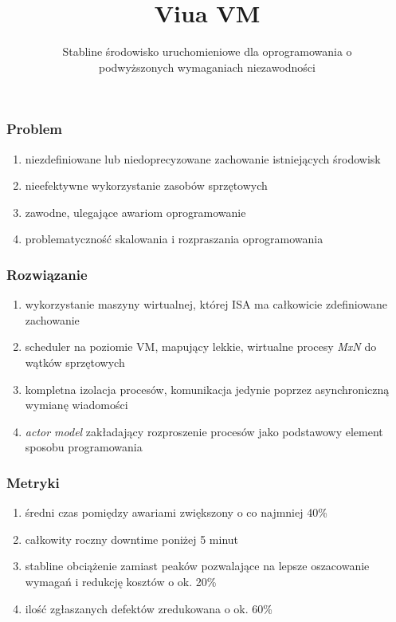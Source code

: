 \documentclass{beamer}
\title{Viua VM}
\subtitle{Stabline środowisko uruchomieniowe dla oprogramowania o\\podwyższonych wymaganiach niezawodności}
\begin{document}

\frame{\titlepage}

\begin{frame}
    \frametitle{Problem}

    \begin{enumerate}
        \item niezdefiniowane lub niedoprecyzowane zachowanie istniejących
            środowisk
        \item nieefektywne wykorzystanie zasobów sprzętowych
        \item zawodne, ulegające awariom oprogramowanie
        \item problematyczność skalowania i rozpraszania oprogramowania
    \end{enumerate}
\end{frame}

\begin{frame}
    \frametitle{Rozwiązanie}

    \begin{enumerate}
        \item wykorzystanie maszyny wirtualnej, której ISA ma całkowicie
            zdefiniowane zachowanie
        \item scheduler na poziomie VM, mapujący lekkie, wirtualne procesy
            \emph{MxN} do wątków sprzętowych
        \item kompletna izolacja procesów, komunikacja jedynie poprzez
            asynchroniczną wymianę wiadomości
        \item \emph{actor model} zakładający rozproszenie procesów jako
            podstawowy element sposobu programowania
    \end{enumerate}
\end{frame}

\begin{frame}
    \frametitle{Metryki}

    \begin{enumerate}
        \item średni czas pomiędzy awariami zwiększony o co najmniej 40\%
        \item całkowity roczny downtime poniżej 5 minut
        \item stabline obciążenie zamiast peaków pozwalające na lepsze
            oszacowanie wymagań i redukcję kosztów o ok. 20\%
        \item ilość zgłaszanych defektów zredukowana o ok. 60\%
    \end{enumerate}
\end{frame}
\end{document}
